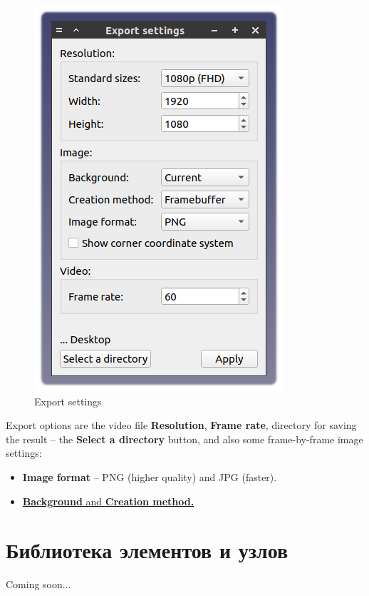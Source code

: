 \documentclass[a4paper,12pt]{article}
\begin{document}
\pagebreak




\begin{figure}[htp]
	\centering
	\includegraphics[scale=1]{img/exploded_es.png}
	\caption{Export settings}
	\label{sec:exploded_es}
\end{figure}

Export options are the video file \textbf{Resolution}, \textbf{Frame rate}, directory for saving the result -- the \textbf{Select a directory} button, and also some frame-by-frame image settings:

\begin{itemize}
	\item \textbf{Image format} -- PNG (higher quality) and JPG (faster).
	\item \href{https://wiki.freecad.org/Std_ViewScreenShot}{\textbf{Background} and \textbf{Creation method.}}
\end{itemize}




\section{Библиотека элементов и узлов}

Coming soon...
\end{document}
